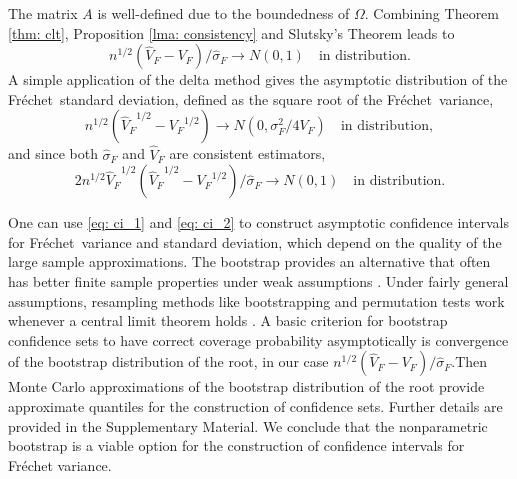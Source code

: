 \documentclass[lineno]{biometrika}
\newcommand{\la}{\label}
\def\cp{\citep}
\def\cp{\citep}
\def\O{\Omega}
\def\F{Fr\'{e}chet}
\def\lra{\longrightarrow}
\def\VF{\hat{V}_F}
\begin{document}
The matrix $A$ is well-defined due to the boundedness of $\O$. Combining Theorem \ref{thm: clt}, Proposition \ref{lma: consistency} and Slutsky's Theorem leads to 
\begin{equation}
\label{eq: ci_1}
n^{1/2}(\VF-V_F) / \hat{\sigma}_F \lra N(0,1) \quad \text{in distribution}. 
\end{equation} 
A simple application of the delta method gives the asymptotic distribution of the \F \ standard deviation, defined as  the square root of the  \F \ variance,			\begin{equation*} \la{std}
n^{1/2}({\VF}^{1/2}-{V_F}^{1/2})\lra N(0,\sigma_F^2/4 V_F) \quad \text{in distribution}, 
\end{equation*}
and since both $\hat{\sigma}_F$ and $\VF$ are consistent estimators,%
\begin{equation}
\label{eq: ci_2}
2 n^{1/2}  {\VF}^{1/2} ({\VF}^{1/2}-{V_F}^{1/2})/\hat{\sigma}_F\lra N(0,1) \quad \text{in distribution}. 
\end{equation}

One can use \eqref{eq: ci_1} and \eqref{eq: ci_2} to construct asymptotic confidence intervals for \F \ variance and standard deviation, which depend on the quality of the large sample approximations. The bootstrap provides an alternative that often has better finite sample properties under weak assumptions 
\cp{bick:81,bera:03}. Under fairly general assumptions, resampling methods like bootstrapping and permutation tests work whenever a central limit theorem holds \cp{jans:03}.  A basic criterion for bootstrap confidence sets to have correct coverage probability asymptotically is convergence of the bootstrap distribution of the root, in our case
$n^{1/2}({\VF}-{V_F})/{\hat{\sigma}_F}$.Then Monte Carlo approximations of the bootstrap distribution of the root provide  approximate quantiles for the construction of confidence sets. Further details are provided in the Supplementary Material. We conclude  that the nonparametric bootstrap is a viable option for the construction of confidence intervals for Fr\'echet variance. 
\end{document}

